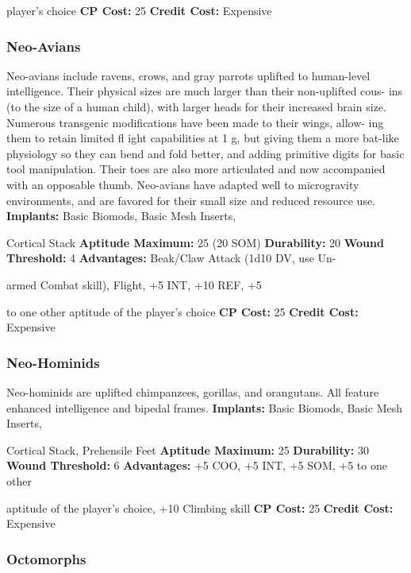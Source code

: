 player's choice
\textbf{CP Cost:} 25
\textbf{Credit Cost: }Expensive

\subsubsection{Neo-Avians}

Neo-avians include ravens, crows, and gray parrots 
uplifted to human-level intelligence. Their physical 
sizes are much larger than their non-uplifted cous-
ins (to the size of a human child), with larger heads 
for their increased brain size. Numerous transgenic 
modifications have been made to their wings, allow-
ing them to retain limited fl ight capabilities at 1 g, 
but giving them a more bat-like physiology so they 
can bend and fold better, and adding primitive digits 
for basic tool manipulation. Their toes are also more 
articulated and now accompanied with an opposable 
thumb. Neo-avians have adapted well to microgravity 
environments, and are favored for their small size and 
reduced resource use.
\textbf{Implants: }Basic Biomods, Basic Mesh Inserts, 

Cortical Stack
\textbf{Aptitude Maximum: }25 (20 SOM)
\textbf{Durability:} 20
\textbf{Wound Threshold:} 4
\textbf{Advantages:  }Beak/Claw Attack (1d10 DV, use Un-

armed Combat skill), Flight, +5 INT, +10 REF, +5 

to one other aptitude of the player's choice
\textbf{CP Cost:} 25
\textbf{Credit Cost: }Expensive

\subsubsection{Neo-Hominids}

Neo-hominids are uplifted chimpanzees, gorillas, and 
orangutans. All feature enhanced intelligence and 
bipedal frames.
\textbf{Implants: }Basic Biomods, Basic Mesh Inserts, 

Cortical Stack, Prehensile Feet
\textbf{Aptitude Maximum:} 25
\textbf{Durability:} 30
\textbf{Wound Threshold:} 6
\textbf{Advantages:} +5 COO, +5 INT, +5 SOM, +5 to one other 

aptitude of the player's choice, +10 Climbing skill
\textbf{CP Cost:} 25
\textbf{Credit Cost: }Expensive

\subsubsection{Octomorphs}

